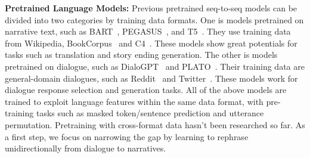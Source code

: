 




\textbf{Pretrained Language Models:} Previous pretrained seq-to-seq models can be divided into two categories by training data formats.
One is models pretrained on narrative text, such as BART~\cite{lewis2020bart}, PEGASUS~\cite{zhang2020pegasus}, and T5~\cite{raffel2020exploring}. They use training data from Wikipedia, BookCorpus~\cite{zhu2015aligning} and C4~\cite{raffel2020exploring}. These models show great potentials for tasks such as translation and story ending generation. %
The other is models pretrained on dialogue, such as DialoGPT~\cite{zhang2020dialogpt} and PLATO~\cite{bao2020plato}. Their training data are general-domain dialogues, such as Reddit~\cite{henderson2019repository} and Twitter~\cite{cho2014learning}. These models work for dialogue response selection and generation tasks. %
All of the above models are trained to exploit language features within the same data format, with pre-training tasks such as masked token/sentence prediction and utterance permutation.
Pretraining with cross-format data hasn't been researched so far. 
As a first step, we focus on narrowing the gap by learning to rephrase unidirectionally from dialogue to narratives.



